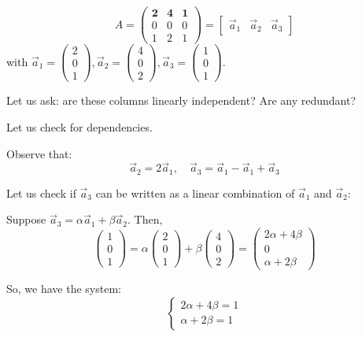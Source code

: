\documentclass[12pt]{article}
\theoremstyle{definition}
\theoremstyle{plain}
\begin{document}
\begin{enumerate}[label=(\alph*)]
\[
A = 
\begin{pmatrix}
\mathbf{2} & \mathbf{4} & \mathbf{1} \\
0 & 0 & 0 \\
1 & 2 & 1
\end{pmatrix}
= \left[ \begin{array}{ccc}
\vec{a}_1 & \vec{a}_2 & \vec{a}_3
\end{array} \right]
\]
with \(
\vec{a}_1 = \begin{pmatrix} 2 \\ 0 \\ 1 \end{pmatrix},
\vec{a}_2 = \begin{pmatrix} 4 \\ 0 \\ 2 \end{pmatrix},
\vec{a}_3 = \begin{pmatrix} 1 \\ 0 \\ 1 \end{pmatrix}
\).

Let us ask: are these columns linearly independent? Are any redundant?

Let us check for dependencies.

Observe that:
\[
\vec{a}_2 = 2\vec{a}_1, \quad \vec{a}_3 = \vec{a}_1 - \vec{a}_1 + \vec{a}_3
\]

Let us check if \( \vec{a}_3 \) can be written as a linear combination of \( \vec{a}_1 \) and \( \vec{a}_2 \):

Suppose \( \vec{a}_3 = \alpha \vec{a}_1 + \beta \vec{a}_2 \).
Then,
\[
\begin{pmatrix} 1 \\ 0 \\ 1 \end{pmatrix} = \alpha \begin{pmatrix} 2 \\ 0 \\ 1 \end{pmatrix} + \beta \begin{pmatrix} 4 \\ 0 \\ 2 \end{pmatrix}
= \begin{pmatrix} 2\alpha + 4\beta \\ 0 \\ \alpha + 2\beta \end{pmatrix}
\]

So, we have the system:
\[
\begin{cases}
2\alpha + 4\beta = 1 \\
\alpha + 2\beta = 1
\end{cases}
\]


\end{enumerate}
\end{document}
